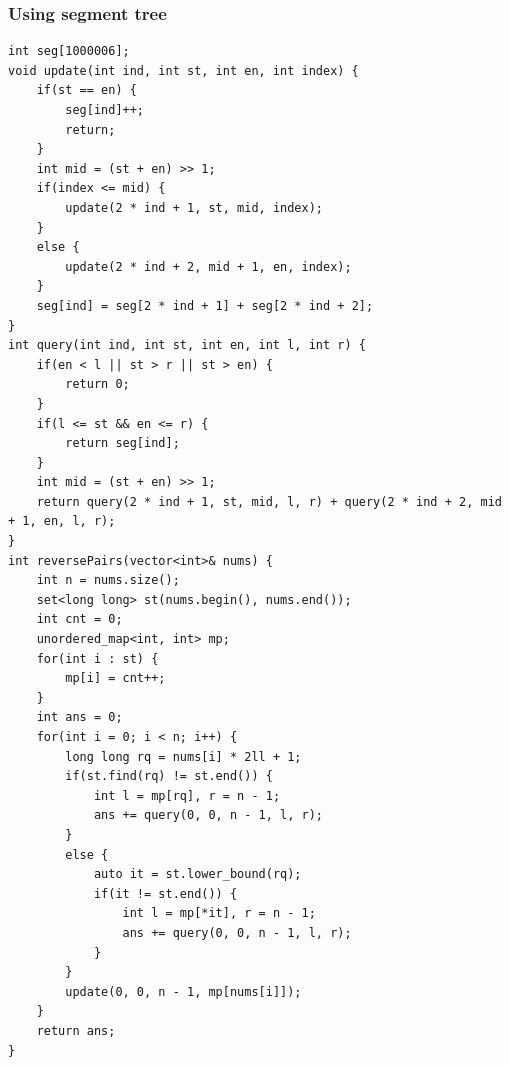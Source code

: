 \documentclass[11pt]{article}
\begin{document}
\subsubsection{Using segment tree}
\label{sec:org3d5df44}
\begin{verbatim}
int seg[1000006];
void update(int ind, int st, int en, int index) {
    if(st == en) {
        seg[ind]++;
        return;
    }
    int mid = (st + en) >> 1;
    if(index <= mid) {
        update(2 * ind + 1, st, mid, index);
    }
    else {
        update(2 * ind + 2, mid + 1, en, index);
    }
    seg[ind] = seg[2 * ind + 1] + seg[2 * ind + 2];
}
int query(int ind, int st, int en, int l, int r) {
    if(en < l || st > r || st > en) {
        return 0;
    }
    if(l <= st && en <= r) {
        return seg[ind];
    }
    int mid = (st + en) >> 1;
    return query(2 * ind + 1, st, mid, l, r) + query(2 * ind + 2, mid + 1, en, l, r);
}
int reversePairs(vector<int>& nums) {
    int n = nums.size();
    set<long long> st(nums.begin(), nums.end());
    int cnt = 0;
    unordered_map<int, int> mp;
    for(int i : st) {
        mp[i] = cnt++;
    }
    int ans = 0;
    for(int i = 0; i < n; i++) {
        long long rq = nums[i] * 2ll + 1;
        if(st.find(rq) != st.end()) {
            int l = mp[rq], r = n - 1;
            ans += query(0, 0, n - 1, l, r);
        }
        else {
            auto it = st.lower_bound(rq);
            if(it != st.end()) {
                int l = mp[*it], r = n - 1;
                ans += query(0, 0, n - 1, l, r);
            }
        }
        update(0, 0, n - 1, mp[nums[i]]);
    }
    return ans;
}
\end{verbatim}
\end{document}
